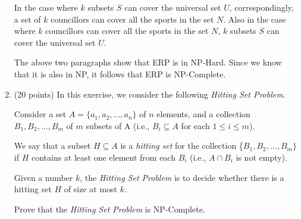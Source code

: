 \documentclass[paper=a4, fontsize=11pt]{scrartcl} %
\numberwithin{equation}{section} %
\numberwithin{figure}{section} %
\numberwithin{table}{section} %
\begin{document}
\begin{enumerate}
In the case where $k$ subsets $S$ can cover the universal set $U$, correspondingly, a set of $k$ councillors can cover all the sports in the set $N$. Also in the case where $k$ councillors can cover all the sports in the set $N$, $k$ subsets $S$ can cover the universal set $U$. 

The above two paragraphs show that ERP is in NP-Hard. Since we know that it is also in NP, it follows that ERP is NP-Complete.\\

\item (20 points) In this exercise, we consider the following \textit{Hitting Set Problem}.

Consider a set $A = \{a_1,a_2,...,a_n\}$ of $n$ elements, and a collection $B_1,B_2,...,B_m$ of $m$ subsets of A (i.e., $B_i \subseteq A$ for each $1\le i \le m$).

We say that a subset $H \subseteq A$ is a \textit{hitting set} for the collection \{$B_1,B_2,...,B_m\}$ if $H$ contains at least one element from each $B_i$ (i.e., $A \cap B_i$ is not empty).

Given a number $k$, the \textit{Hitting Set Problem} is to decide whether there is a hitting set $H$ of size at most $k$.

Prove that the \textit{Hitting Set Problem} is NP-Complete.\\


\end{enumerate}

\end{document}
